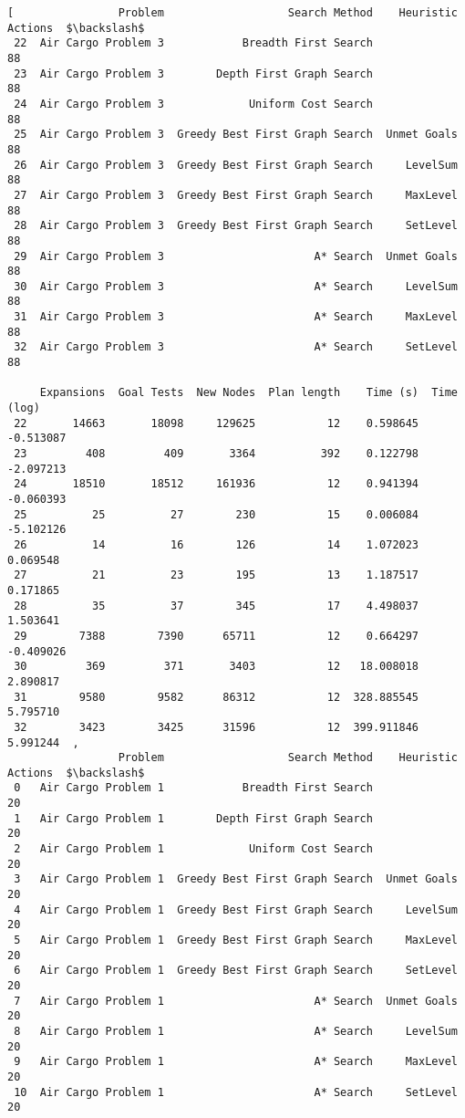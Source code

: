 \documentclass{article}
\begin{document}
\begin{verbatim}[                Problem                   Search Method    Heuristic  Actions  $\backslash$
 22  Air Cargo Problem 3            Breadth First Search                    88   
 23  Air Cargo Problem 3        Depth First Graph Search                    88   
 24  Air Cargo Problem 3             Uniform Cost Search                    88   
 25  Air Cargo Problem 3  Greedy Best First Graph Search  Unmet Goals       88   
 26  Air Cargo Problem 3  Greedy Best First Graph Search     LevelSum       88   
 27  Air Cargo Problem 3  Greedy Best First Graph Search     MaxLevel       88   
 28  Air Cargo Problem 3  Greedy Best First Graph Search     SetLevel       88   
 29  Air Cargo Problem 3                       A* Search  Unmet Goals       88   
 30  Air Cargo Problem 3                       A* Search     LevelSum       88   
 31  Air Cargo Problem 3                       A* Search     MaxLevel       88   
 32  Air Cargo Problem 3                       A* Search     SetLevel       88   
 
     Expansions  Goal Tests  New Nodes  Plan length    Time (s)  Time (log)  
 22       14663       18098     129625           12    0.598645   -0.513087  
 23         408         409       3364          392    0.122798   -2.097213  
 24       18510       18512     161936           12    0.941394   -0.060393  
 25          25          27        230           15    0.006084   -5.102126  
 26          14          16        126           14    1.072023    0.069548  
 27          21          23        195           13    1.187517    0.171865  
 28          35          37        345           17    4.498037    1.503641  
 29        7388        7390      65711           12    0.664297   -0.409026  
 30         369         371       3403           12   18.008018    2.890817  
 31        9580        9582      86312           12  328.885545    5.795710  
 32        3423        3425      31596           12  399.911846    5.991244  ,
                 Problem                   Search Method    Heuristic  Actions  $\backslash$
 0   Air Cargo Problem 1            Breadth First Search                    20   
 1   Air Cargo Problem 1        Depth First Graph Search                    20   
 2   Air Cargo Problem 1             Uniform Cost Search                    20   
 3   Air Cargo Problem 1  Greedy Best First Graph Search  Unmet Goals       20   
 4   Air Cargo Problem 1  Greedy Best First Graph Search     LevelSum       20   
 5   Air Cargo Problem 1  Greedy Best First Graph Search     MaxLevel       20   
 6   Air Cargo Problem 1  Greedy Best First Graph Search     SetLevel       20   
 7   Air Cargo Problem 1                       A* Search  Unmet Goals       20   
 8   Air Cargo Problem 1                       A* Search     LevelSum       20   
 9   Air Cargo Problem 1                       A* Search     MaxLevel       20   
 10  Air Cargo Problem 1                       A* Search     SetLevel       20   
 

\end{verbatim}
\end{document}
